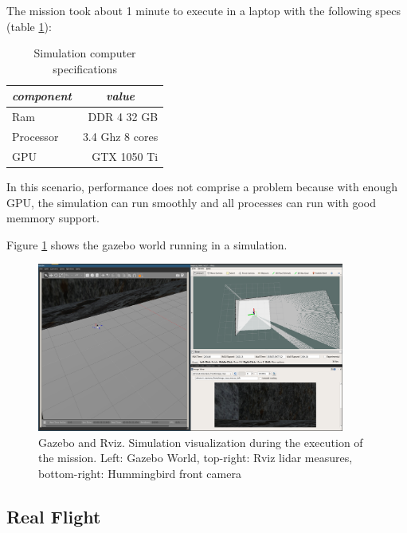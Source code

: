     The mission took about 1 minute to execute in a laptop with the following specs (table \ref{ch_5:table:laptop_specs}):

    \begin{table}[!h]
      \centering
      \begin{tabular}{lr} \toprule
        \multicolumn{1}{c}{\textit{component}} & \multicolumn{1}{c}{\textit{value}}   \\ \midrule
        Ram           & DDR 4 32 GB     \\
        Processor     & 3.4 Ghz 8 cores \\
        GPU           & GTX 1050 Ti     \\ \bottomrule
        \hline
      \end{tabular}
      \caption{Simulation computer specifications}
      \label{ch_5:table:laptop_specs}
    \end{table}

    In this scenario, performance does not comprise a problem because with enough GPU, the simulation can run smoothly and all processes can run with good memmory support. 

    Figure \ref{ch_5:fig:full_sim} shows the gazebo world running in a simulation.
    
    \begin{figure}
      \centering
      \includegraphics[width=0.9\textwidth,height=0.5\textheight,keepaspectratio]{./Figures/FullSim.png}
      \caption{Gazebo and Rviz. Simulation visualization during the execution of the mission. Left: Gazebo World, top-right: Rviz lidar measures, bottom-right: Hummingbird front camera}
      \label{ch_5:fig:full_sim}
    \end{figure}

  \subsection{Real Flight} \label{ch_5:subsect:exp_real_flight}


